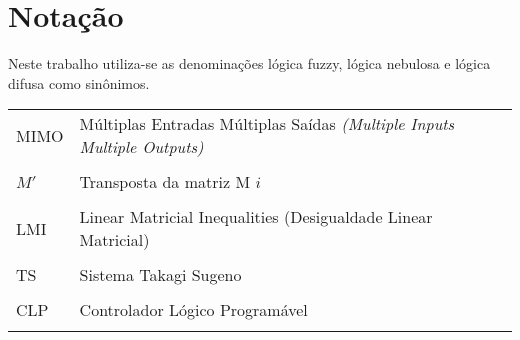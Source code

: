 %

\chapter*{Notação}

Neste trabalho utiliza-se as denominações lógica fuzzy, lógica nebulosa e lógica difusa como sinônimos.

\begin{tabular}{>{\centering}p{}l}
	MIMO & Múltiplas Entradas Múltiplas Saídas \textit{(Multiple Inputs Multiple Outputs)} \\ \tabularnewline
	$M'$ & Transposta da matriz M $i$ \\\tabularnewline
	LMI & Linear Matricial Inequalities (Desigualdade Linear Matricial) \\ \tabularnewline
	TS & Sistema Takagi Sugeno \\ \tabularnewline
	CLP & Controlador Lógico Programável \\	\tabularnewline
\end{tabular}


